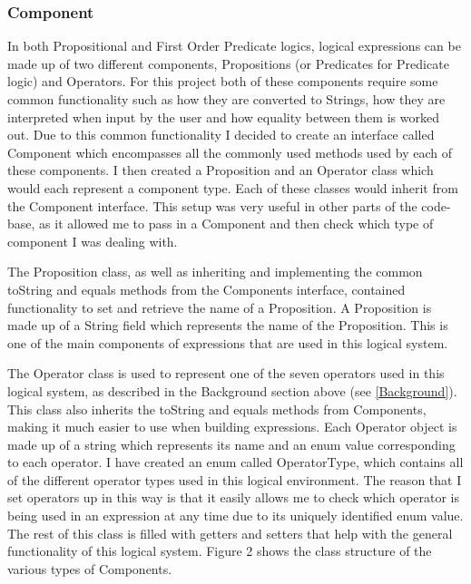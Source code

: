 \subsubsection{Component}
In both Propositional and First Order Predicate logics, logical expressions can be made up of two different components, Propositions (or Predicates for Predicate logic) and Operators. For this project both of these components require some common functionality such as how they are converted to Strings, how they are interpreted when input by the user and how equality between them is worked out. Due to this common functionality I decided to create an interface called Component which encompasses all the commonly used methods used by each of these components. I then created a Proposition and an Operator class which would each represent a component type. Each of these classes would inherit from the Component interface. This setup was very useful in other parts of the code-base, as it allowed me to pass in a Component and then check which type of component I was dealing with.  

The Proposition class, as well as inheriting and implementing the common toString and equals methods from the Components interface, contained functionality to set and retrieve the name of a Proposition. A Proposition is made up of a String field which represents the name of the Proposition. This is one of the main components of expressions that are used in this logical system.

The Operator class is used to represent one of the seven operators used in this logical system, as described in the Background section above (see \ref{Background}). This class also inherits the toString and equals methods from Components, making it much easier to use when building expressions. Each Operator object is made up of a string which represents its name and an enum value corresponding to each operator. I have created an enum called OperatorType, which contains all of the different operator types used in this logical environment. The reason that I set operators up in this way is that it easily allows me to check which operator is being used in an expression at any time due to its uniquely identified enum value. The rest of this class is filled with getters and setters that help with the general functionality of this logical system. Figure 2 shows the class structure of the various types of Components.

